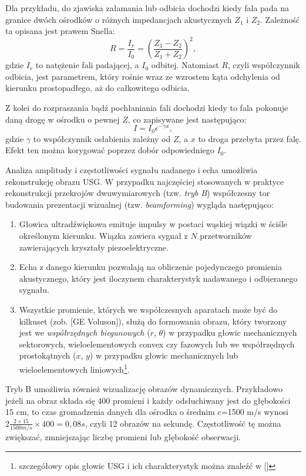 Dla przykładu, do zjawiska załamania lub odbicia dochodzi kiedy fala pada na granice dwóch ośrodków o różnych impedancjach akustycznych $Z_1$ i $Z_2$. Zależność ta opisana jest prawem Snella:
\begin{equation}
R = \frac{I_r}{I_0} = \left(\frac{Z_1-Z_2}{Z_1+Z_2}\right)^2,
\end{equation}
gdzie $I_r$ to natężenie fali padającej, a $I_0$ odbitej. Natomiast $R$, czyli współczynnik odbicia, jest parametrem, który rośnie wraz ze wzrostem kąta odchylenia od kierunku prostopadłego, aż do całkowitego odbicia.

Z kolei do rozpraszania bądź pochłaniania fali dochodzi kiedy to fala pokonuje daną drogę w ośrodku o pewnej $Z$, co zapisywane jest następująco:
\begin{equation}
I=I_0 \epsilon^{-\gamma x},
\end{equation}
gdzie $\gamma$ to współczynnik osłabienia zależny od $Z$, a $x$ to droga przebyta przez falę. Efekt ten można korygować poprzez dobór odpowiedniego $I_0$.

Analiza amplitudy i częstotliwości sygnału nadanego i echa umożliwia rekonstrukcję obrazu USG. W przypadku najczęściej stosowanych w praktyce rekonstrukcji przekrojów dwuwymiarowych (tzw. \textit{tryb B}) współczesny tor budowania prezentacji wizualnej (tzw. \textit{beamforming}) wygląda następująco: 
\begin{enumerate}
	\item Głowica ultradźwiękowa emituje impulsy w postaci wąskiej wiązki w ściśle określonym kierunku. Wiązka zawiera sygnał z $N$ przetworników zawierających kryształy piezoelektryczne.
	\item Echa z danego kierunku pozwalają na obliczenie pojedynczego promienia akustycznego, który jest iloczynem charakterystyk nadawanego i odbieranego sygnału.
	\item Wszystkie promienie, których we współczesnych aparatach może być do kilkuset (zob. [GE Voluson]), służą do formowania obrazu, który tworzony jest we \textit{współrzędnych biegunowych} ($r$, $\theta$) w przypadku głowic mechanicznych sektorowych, wieloelementowych convex czy fazowych lub we współrzędnych prostokątnych ($x$, $y$) w przypadku głowic mechanicznych lub wieloelementowych liniowych\footnote{szczegółowy opis głowic USG i ich charakterystyk można znaleźć w []}. 
\end{enumerate}

Tryb B umożliwia również wizualizację obrazów dynamicznych. Przykładowo jeżeli na obraz składa się 400 promieni i każdy odsłuchiwany jest do głębokości 15 cm, to czas gromadzenia danych dla ośrodka o średnim c=1500 m/s wynosi $2\frac{2\times15}{1500 m/s}\times400 = 0,08 s$, czyli 12 obrazów na sekundę. Częstotliwość tę można zwiększać, zmniejszając liczbę promieni lub głębokość obserwacji.

